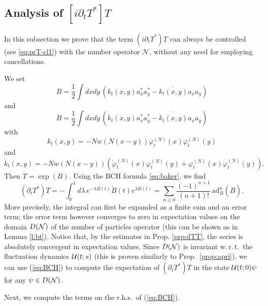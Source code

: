 \documentclass[11pt,a4paper]{article}
\newcommand{\done}{}
\newcommand{\cU}{{\cal U}}
\newcommand{\cN}{{\cal N}}
\newcommand{\ad}{\operatorname{ad}}	%
\newcommand{\di}{{d}}		%
\newcommand{\Ncal}{\mathcal{N}}		%
\begin{document}
\subsection{Analysis of $[i \partial_t T^*] T$}
In this subsection we prove that the term $(i \partial_t T^*) T$ can always be controlled (see \eqref{eq:prT-cl1}) with the number operator $\Ncal$, without any need for employing cancellations.

We set 
\[ B = \frac{1}{2} \int dx dy \, \left( k_t (x,y) a_x^* a_y^* - \overline{k_t (x,y)} a_x a_y \right) \]
and 
\[ \dot{B} =  \frac{1}{2} \int dx dy \, \left( \dot{k}_t (x,y) a_x^* a_y^* - \overline{\dot{k}_t (x,y)} a_x a_y \right) \]
with 
\[ k_t (x,y) = -N w(N(x-y)) \varphi_t^{(N)} (x) \varphi_t^{(N)} (y) \]
and
\[ \dot{k}_t (x,y) = - N w (N (x-y))  \left( \dot{\varphi}_t^{(N)} (x) \varphi_t^{(N)} (y) + \varphi_t^{(N)} (x) \dot{\varphi}_t^{(N)} (y) \right). \]
Then $T = \exp (B)$. Using the BCH formula \eqref{eq:baker}, we find%
\begin{equation}\label{eq:BCH} \left(\partial_t T^* \right) T = -\int_0^1 \di\lambda\, e^{-\lambda B(t)} \dot B(t) e^{\lambda B(t)} = \sum_{n \geq 0} \frac{(-1)^{n+1}}{(n+1)!}\,  \text{ad}^n_{B} (\dot{B}). \end{equation}
More precisely, the integral can first be expanded as a finite sum and an error term; the error term  however converges to zero in expectation values on the domain $D(\cN)$ of the number of particles operator (this can be shown as in Lemma \ref{l:bt}). Notice that, by the estimates in Prop. \ref{prp:dTT}, the series is absolutely convergent in expectation values. Since $D(\cN)$ is invariant w.\,r.\,t.\ the fluctuation dynamics $\cU (t;s)$ (this is proven similarly to Prop.\ \ref{prop:apri})\done{}, we can use (\ref{eq:BCH}) to compute the expectation of $(\partial_t T^*) T$ in the state $\cU (t;0) \psi$ for any $\psi \in D(\cN)$. 

Next, we compute the terms on the r.h.s.\ of (\ref{eq:BCH}).
\end{document}
